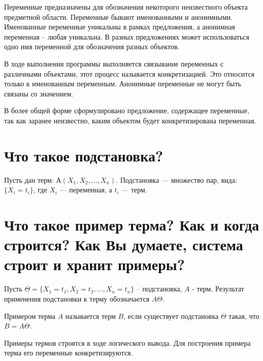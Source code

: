 Переменные предназначены для обозначения некоторого неизвестного объекта предметной области. Переменные бывают именованными и анонимными. Именованные переменные уникальны в рамках предложения, а анонимная переменная – любая уникальна. В разных предложениях может использоваться одно имя переменной для обозначения разных объектов.

В ходе выполнения программы выполняется связывание переменных с различными объектами, этот процесс называется конкретизацией. Это относится только к именованным переменным. Анонимные переменные не могут быть связаны со значением.

В более общей форме сформулировано предложение, содержащее переменные, так как заранее неизвестно, каким объектом будет конкретизирована переменная.

\section{Что такое подстановка?}

Пусть дан терм: $А(X_1, X_2, \ldots , X_n)$.
Подстановка --- множество пар, вида: \\ $\{X _ i = t _ i\}$, где $X_i$ --- переменная, а $t_i$ --- терм.

\section{Что такое пример терма? Как и когда строится? Как Вы думаете, система строит и хранит примеры?}

Пусть $\Theta =  \{X_1 = t_1, X_2= t_2, \dots , X_n = t_n \}$   –   подстановка, $A$ - терм. Результат применения подстановки к терму обозначается $A\Theta$.

Примером терма $A$ называется терм $B$, если существует подстановка $\Theta$ такая, что $B = A\Theta$.

Примеры термов строятся в ходе логического вывода. Для построения примера терма его переменные конкретизируются.